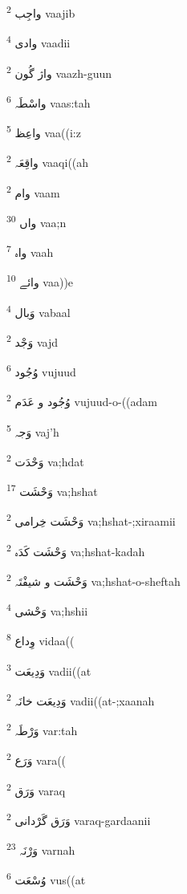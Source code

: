 \documentclass[12pt]{article}
\begin{document}
\begin{RTL}
\begin{multicols}{5}
{\ur واجِب}   \textsuperscript{2} vaajib

{\ur وادی}   \textsuperscript{4} vaadii

{\ur واژ گُون}   \textsuperscript{2} vaazh-guun

{\ur واسْطَہ}   \textsuperscript{6} vaas:tah

{\ur واعِظ}   \textsuperscript{5} vaa((i:z

{\ur واقِعَہ}   \textsuperscript{2} vaaqi((ah

{\ur وام}   \textsuperscript{2} vaam

{\ur واں}   \textsuperscript{30} vaa;n

{\ur واہ}   \textsuperscript{7} vaah

{\ur وائے}   \textsuperscript{10} vaa))e

{\ur وَبال}   \textsuperscript{4} vabaal

{\ur وَجْد}   \textsuperscript{2} vajd

{\ur وُجُود}   \textsuperscript{6} vujuud

{\ur وُجُود و عَدَم}   \textsuperscript{2} vujuud-o-((adam

{\ur وَجہ}   \textsuperscript{5} vaj'h

{\ur وَحْدَت}   \textsuperscript{2} va;hdat

{\ur وَحْشَت}   \textsuperscript{17} va;hshat

{\ur وَحْشَت خِرامی}   \textsuperscript{2} va;hshat-;xiraamii

{\ur وَحْشَت کَدَہ}   \textsuperscript{2} va;hshat-kadah

{\ur وَحْشَت و شیفْتَہ}   \textsuperscript{2} va;hshat-o-sheftah

{\ur وَحْشی}   \textsuperscript{4} va;hshii

{\ur وِداع}   \textsuperscript{8} vidaa((

{\ur وَدِیعَت}   \textsuperscript{3} vadii((at

{\ur وَدِیعَت خانَہ}   \textsuperscript{2} vadii((at-;xaanah

{\ur وَرْطَہ}   \textsuperscript{2} var:tah

{\ur وَرَع}   \textsuperscript{2} vara((

{\ur وَرَق}   \textsuperscript{2} varaq

{\ur وَرَق گَرْدانی}   \textsuperscript{2} varaq-gardaanii

{\ur وَرْنَہ}   \textsuperscript{23} varnah

{\ur وُسْعَت}   \textsuperscript{6} vus((at


\end{multicols}
\end{RTL}
\end{document}
